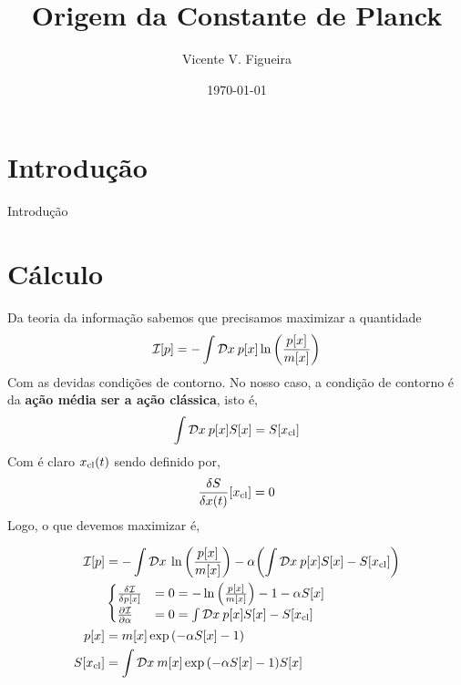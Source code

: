 \documentclass[twoside]{amsart}
\title{
Origem da Constante de Planck
}
\author{
  Vicente V. Figueira
       }
\date{\today}
\newcommand{\Dd}[1]{\mathcal D #1\: }
\numberwithin{equation}{section}
\begin{document}
\maketitle

\tableofcontents


\section{Introdução}

Introdução



\section{Cálculo}
  
Da teoria da informação sabemos que precisamos maximizar a quantidade 
$$\mathcal I\qty[p]=-\int\Dd {x}p\qty[x]\ln\qty(\frac{p\qty[x]}{m\qty[x]})$$ Com as devidas condições 
de contorno. No nosso caso, a condição de contorno é da \textbf{ação média ser a ação clássica}, isto é,
$$\int\Dd xp\qty[x]S\qty[x]=S[x_{\textnormal{cl}}]$$ Com é claro $x_{\textnormal{cl}}\qty(t)$ sendo 
definido por, $$\fdv{S}{x\qty(t)}\qty[x_{\textnormal{cl}}]=0$$ Logo, o que devemos maximizar é,

\begin{align*}
    \mathcal I\qty[p]&=-\int\Dd x\ln\qty(\frac{p\qty[x]}{m\qty[x]})-\alpha\qty(\int\Dd xp\qty[x]S\qty[x]-S\qty[x_{\textnormal{cl}}])\\
    &\begin{cases}
        \fdv{\mathcal I}{p\qty[x]}&=0=-\ln\qty(\frac{p\qty[x]}{m\qty[x]})-1-\alpha S\qty[x]\\
        \pdv{\mathcal I}{\alpha}&=0=\int\Dd xp\qty[x]S\qty[x]-S[x_{\textnormal{cl}}]
    \end{cases}\\
    p\qty[x]&=m\qty[x]\exp\qty(-\alpha S\qty[x]-1)\\
    S\qty[x_{\textnormal{cl}}]&=\int\Dd{x}m\qty[x]\exp\qty(-\alpha S\qty[x]-1)S\qty[x]
\end{align*}
  
\end{document}
